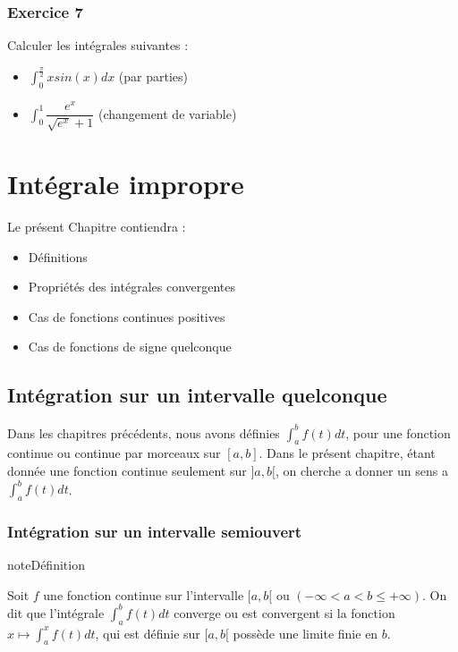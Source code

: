 \documentclass[letterpaper,10pt,french]{sphinxmanual}
\begin{document}
\subsection{Exercice 7}
\label{\detokenize{exo2:exercice-7}}
\sphinxAtStartPar
Calculer les intégrales suivantes :
\begin{itemize}
\item {} 
\sphinxAtStartPar
\(\int_0^{\frac{\pi}{2}} xsin(x)dx\) (par parties)

\item {} 
\sphinxAtStartPar
\(\int_0^1 \dfrac{e^x}{\sqrt{e^x}+1}\) (changement de variable)

\end{itemize}


\chapter{Intégrale impropre}
\label{\detokenize{integrationq:integrale-impropre}}\label{\detokenize{integrationq::doc}}
\sphinxAtStartPar
Le présent Chapitre contiendra :
\begin{itemize}
\item {} 
\sphinxAtStartPar
Définitions

\item {} 
\sphinxAtStartPar
Propriétés des intégrales convergentes

\item {} 
\sphinxAtStartPar
Cas de fonctions continues positives

\item {} 
\sphinxAtStartPar
Cas de fonctions de signe quelconque

\end{itemize}


\section{Intégration sur un intervalle quelconque}
\label{\detokenize{def:integration-sur-un-intervalle-quelconque}}\label{\detokenize{def::doc}}
\sphinxAtStartPar
Dans les chapitres précédents, nous avons définies \(\int_a^b f(t)dt\), pour une fonction continue ou continue par morceaux sur \([a, b]\). Dans le présent chapitre, étant donnée une fonction continue seulement sur \(]a, b[\), on cherche a donner un sens a \(\int_a^b f(t)dt\).


\subsection{Intégration sur un intervalle semi\sphinxhyphen{}ouvert}
\label{\detokenize{def:integration-sur-un-intervalle-semi-ouvert}}
\begin{sphinxadmonition}{note}{Définition}

\sphinxAtStartPar
Soit \(f\) une fonction continue sur l’intervalle \([a, b[\) ou \((-\infty <a < b \leq +\infty)\).
On dit que l’intégrale \(\int_a^b f(t)dt\) converge ou est convergent si la fonction \(x\mapsto \int_a^x f(t)dt\), qui est définie sur \([a, b[\)  possède une limite finie en \(b\).
\end{sphinxadmonition}
\end{document}

